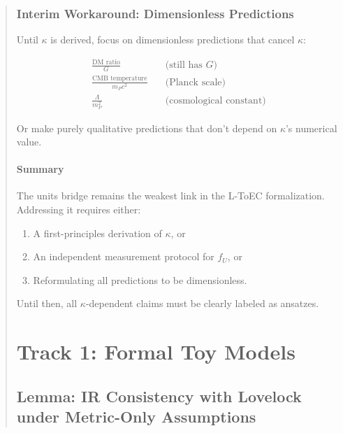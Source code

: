 \documentclass[11pt,titlepage]{article}
\begin{document}
\begin{abstract}
\subsubsection{Interim Workaround: Dimensionless Predictions}
Until $\kappa$ is derived, focus on dimensionless predictions that cancel $\kappa$:

\begin{align*}
\frac{\text{DM ratio}}{G} &\quad\text{(still has $G$)} \\
\frac{\text{CMB temperature}}{m_P c^2} &\quad\text{(Planck scale)} \\
\frac{\Lambda}{m_P^2} &\quad\text{(cosmological constant)}
\end{align*}

Or make purely qualitative predictions that don't depend on $\kappa$'s numerical value.

\paragraph{Summary}
The units bridge remains the weakest link in the L-ToEC formalization. Addressing it requires either:
\begin{enumerate}
\item A first-principles derivation of $\kappa$, or
\item An independent measurement protocol for $f_U$, or
\item Reformulating all predictions to be dimensionless.
\end{enumerate}

Until then, all $\kappa$-dependent claims must be clearly labeled as ansatzes.


\section{Track 1: Formal Toy Models}


\subsection{Lemma: IR Consistency with Lovelock under Metric-Only Assumptions}
\label{lemma:lovelock-consistency}


\end{abstract}
\end{document}
